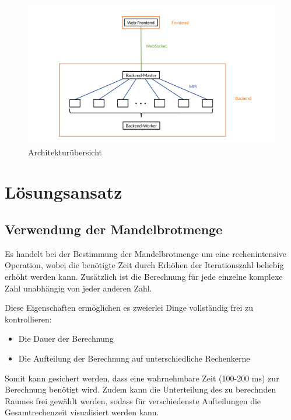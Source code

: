 \begin{figure}[h!]
	\centering
	\includegraphics[width=0.98\linewidth]{img/Implementierung/Kommunikation.pdf}
	\caption{Architekturübersicht}
	\label{fig:architekturuebersicht}
\end{figure}

\section{Lösungsansatz}

\subsection{Verwendung der Mandelbrotmenge}

Es handelt bei der Bestimmung der Mandelbrotmenge um eine rechenintensive Operation, wobei
die benötigte Zeit durch Erhöhen der Iterationszahl beliebig erhöht werden kann.
Zusätzlich ist die Berechnung für jede einzelne komplexe Zahl unabhängig von
jeder anderen Zahl.

Diese Eigenschaften ermöglichen es zweierlei Dinge vollständig frei zu kontrollieren:
\begin{itemize}
	\item Die Dauer der Berechnung
	\item Die Aufteilung der Berechnung auf unterschiedliche Rechenkerne
\end{itemize}

Somit kann gesichert werden, dass eine wahrnehmbare Zeit (100-200 ms) zur Berechnung benötigt wird.
Zudem kann die Unterteilung des zu berechnden Raumes frei gewählt werden, sodass
für verschiedenste Aufteilungen die Gesamtrechenzeit visualisiert werden kann.

